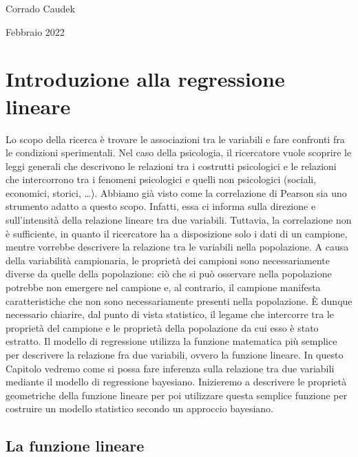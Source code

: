 \documentclass[
  10pt,
  italian,
  a4paper,
  extrafontsizes,onecolumn,openright
  ]{memoir}
\begin{document}
\bigskip

Corrado Caudek

\bigskip

Febbraio 2022

\mainmatter

\hypertarget{regr-models-intro}{%
\chapter{Introduzione alla regressione lineare}\label{regr-models-intro}}

Lo scopo della ricerca è trovare le associazioni tra le variabili e fare
confronti fra le condizioni sperimentali. Nel caso della psicologia, il
ricercatore vuole scoprire le leggi generali che descrivono le relazioni
tra i costrutti psicologici e le relazioni che intercorrono tra i
fenomeni psicologici e quelli non psicologici (sociali, economici,
storici, \ldots). Abbiamo già visto come la correlazione di Pearson sia uno
strumento adatto a questo scopo. Infatti, essa ci informa sulla
direzione e sull'intensità della relazione lineare tra due variabili.
Tuttavia, la correlazione non è sufficiente, in quanto il ricercatore ha
a disposizione solo i dati di un campione, mentre vorrebbe descrivere la
relazione tra le variabili nella popolazione. A causa della variabilità
campionaria, le proprietà dei campioni sono necessariamente diverse da
quelle della popolazione: ciò che si può osservare nella popolazione
potrebbe non emergere nel campione e, al contrario, il campione
manifesta caratteristiche che non sono necessariamente presenti nella
popolazione. È dunque necessario chiarire, dal punto di vista
statistico, il legame che intercorre tra le proprietà del campione e le
proprietà della popolazione da cui esso è stato estratto.
Il modello di regressione utilizza la funzione matematica più semplice
per descrivere la relazione fra due variabili, ovvero la funzione
lineare. In questo Capitolo vedremo come si possa fare inferenza sulla relazione tra due variabili mediante il modello di regressione bayesiano. Inizieremo a descrivere le proprietà geometriche della funzione lineare per poi utilizzare questa semplice funzione per costruire un modello statistico secondo un approccio bayesiano.

\hypertarget{la-funzione-lineare}{%
\section{La funzione lineare}\label{la-funzione-lineare}}
\end{document}
